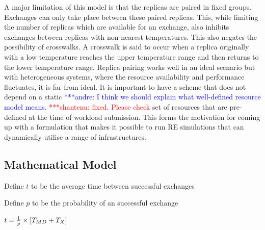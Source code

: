 \documentclass{rspublic}
\newcommand{\jhanote}[1]{ {\textcolor{red} { ***shantenu: #1 }}}
\newcommand{\alnote}[1]{ {\textcolor{blue} { ***andre: #1 }}}
\newcommand{\alnote}[1]{}
\newcommand{\jhanote}[1]{}
\begin{document}
A major limitation of this model is that the replicas are paired in fixed groups. 
Exchanges can only take place between these paired replicas.
This, while limiting the number of replicas which are available for an exchange, also inhibits exchanges between replicas with non-nearest temperatures. This also negates the possibility of crosswalks. A crosswalk is said to occur when a replica originally with a low temperature reaches the upper temperature range and then returns to the lower temperature range. %
Replica pairing works well in an ideal scenario but with heterogeneous
systems, where the resource availability and performance fluctuates,
it is far from ideal. It is important to have a scheme that does not
depend on a static \alnote{I think we should explain what well-defined
  resource model means.} \jhanote{fixed. Please check} set of
resources that are pre-defined at the time of workload submission.
This forms the motivation for coming up with a formulation that makes
it possible to run RE simulations that can dynamically utilise a range
of infrastructures.
  

\subsection{Mathematical Model}

Define $t$ to be the average time between successful exchanges

Define $p$ to be the probability of an successful exchange

$t=  {1 \over p} \times {[T_{MD} + T_{X}]} $
\end{document}
